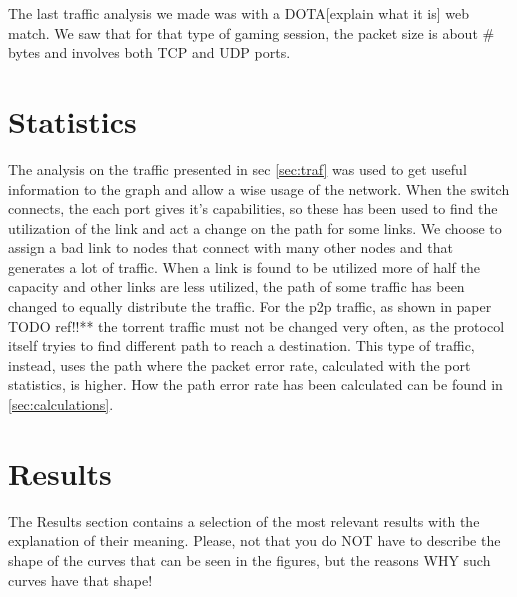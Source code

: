 \documentclass[conference,10pt]{IEEEtran}
\begin{document}
The last traffic analysis we made was with a DOTA[explain what it is] web match.
We saw that for that type of gaming session, the packet size is about \# bytes and involves both TCP and UDP ports.

\section{Statistics}
The analysis on the traffic presented in sec \ref{sec:traf} was used to get useful information to the graph and allow
a wise usage of the network. When the switch connects, the each port gives it's capabilities, so these has been used to
find the utilization of the link and act a change on the path for some links. We choose to assign a bad link
to nodes that connect with many other nodes and that generates a lot of traffic. When a link is found to be utilized more of half the
capacity and other links are less utilized, the path of some traffic has been changed to equally distribute the traffic.
For the p2p traffic, as shown in paper TODO ref!!** the torrent traffic must not be changed very often, as
the protocol itself tryies to find different path to reach a destination. This type of traffic, instead, uses the path
where the packet error rate, calculated with the port statistics, is higher. How the path error rate has been calculated
can be found in \ref{sec:calculations}.

\section{Results}\label{sec:res}
The Results section contains a selection of the most relevant results with the explanation of their meaning. Please, not that you do NOT have to describe the shape of the curves that can be seen in the figures, but the reasons WHY such curves have that shape!
\end{document}
